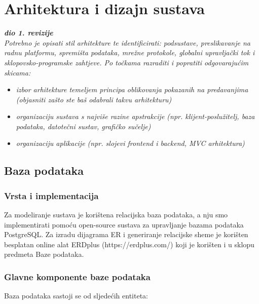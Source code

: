 \chapter{Arhitektura i dizajn sustava}
		
		\textbf{\textit{dio 1. revizije}}\\

		\textit{ Potrebno je opisati stil arhitekture te identificirati: podsustave, preslikavanje na radnu platformu, spremišta podataka, mrežne protokole, globalni upravljački tok i sklopovsko-programske zahtjeve. Po točkama razraditi i popratiti odgovarajućim skicama:}
	\begin{itemize}
		\item 	\textit{izbor arhitekture temeljem principa oblikovanja pokazanih na predavanjima (objasniti zašto ste baš odabrali takvu arhitekturu)}
		\item 	\textit{organizaciju sustava s najviše razine apstrakcije (npr. klijent-poslužitelj, baza podataka, datotečni sustav, grafičko sučelje)}
		\item 	\textit{organizaciju aplikacije (npr. slojevi frontend i backend, MVC arhitektura) }		
	\end{itemize}

	
		

		

				
		\section{Baza podataka}
			
			
		
		
		\subsection{Vrsta i implementacija}
		Za modeliranje sustava je korištena relacijska baza podataka, a nju smo implementirati pomoću open-source sustava za upravljanje bazama podataka PostgreSQL. Za izradu dijagrama ER i generiranje relacijske sheme je korišten besplatan online alat ERDplus (https://erdplus.com/) koji je korišten i u sklopu predmeta Baze podataka. 
		
		
		
		\subsection{Glavne komponente baze podataka}
		Baza podataka sastoji se od sljedećih entiteta:
		
